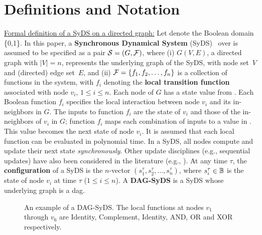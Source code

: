 \section{Definitions and Notation}
\label{sec:defs}

\smallskip
\noindent
\underline{\textsf{Formal definition of a SyDS on a directed graph:}}
Let \bbb{} denote the Boolean domain \{0,1\}.
In this paper, a \textbf{Synchronous Dynamical System} (SyDS)~
\cals{} over \bbb{} is assumed to be specified as
a pair ${\mbox{$\mathcal{S}$}}  = (G, {\mbox{$\mathcal{F}$}})$, where
(i) $G(V,E)$, a directed graph with $|V| = n$,
represents the underlying graph of the SyDS,
with node set~$V$ and (directed) edge set~$E$, and
(ii) ${\mbox{$\mathcal{F}$}} = \{f_1, f_2, \ldots, f_n \}$ is a collection of
functions in the system, with
$f_i$ denoting the \textbf{local transition
function} associated with node $v_i$, $1 \leq i \leq n$.
Each node of $G$ has a state value from \bbb.
Each Boolean function $f_i$ specifies the local interaction
between node $v_i$ and its in-neighbors in $G$.
The inputs to function $f_i$ are the state of $v_i$ and
those of the in-neighbors of $v_i$ in $G$;
function $f_i$ maps
each combination of inputs to a value in \bbb.
This value becomes the next state of node $v_i$.
It is assumed that each local function can be evaluated in
polynomial time.
In a SyDS, all nodes compute and update their next state
\emph{synchronously}.
Other update disciplines (e.g., sequential updates)
have also been considered in the literature (e.g., \cite{MR-2007}).
At any time $\tau$,
the {\bf configuration} \calc{} of a SyDS
is the $n$-vector $(s_1^{\tau}, s_2^{\tau}, \ldots, s_n^{\tau})$,
where $s_i^{\tau} \in \mbox{$\mathbb{B}$}$ is the state of
node $v_i$ at time $\tau$ ($1 \leq i \leq n$).
A \textbf{DAG-SyDS} is a SyDS whose underlying graph is a dag.

\begin{figure}
\begin{center}

\end{center}
\caption{An example of a DAG-SyDS.
The local functions at nodes $v_1$ through
$v_6$ are Identity, Complement, Identity, AND, OR and
XOR respectively.}
\label{fig:ex_dag_syds}
\end{figure}

\smallskip

